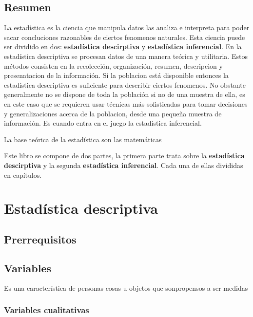 \documentclass[10pt,]{krantz}
\theoremstyle{definition}
\theoremstyle{definition}
\theoremstyle{definition}
\theoremstyle{definition}
\theoremstyle{remark}
\begin{document}
\hypertarget{resumen}{%
\chapter*{Resumen}\label{resumen}}


La estadística es la ciencia que manipula datos las analiza e interpreta para poder sacar concluciones razonables de ciertos fenomenos naturales. Esta ciencia puede ser dividido en dos: \textbf{estadística descirptiva} y \textbf{estadística inferencial}. En la estadística descriptiva se procesan datos de una manera teórica y utilitaria. Estos métodos consisten en la recolección, organización, resumen, descripcion y presenatacion de la información. Si la poblacion está disponible entonces la estadística descriptiva es suficiente para describir ciertos fenomenos. No obstante generalmente no se dispone de toda la población si no de una muestra de ella, es en este caso que se requieren usar técnicas más sofisticadas para tomar decisiones y generalizaciones acerca de la poblacion, desde una pequeña muestra de información. Es cuando entra en el juego la estadística inferencial.

La base teórica de la estadística son las matemáticas

Este libro se compone de dos partes, la primera parte trata sobre la \textbf{estadística descirptiva} y la segunda \textbf{estadística inferencial}. Cada una de ellas divididas en capítulos.

\mainmatter

\hypertarget{part-estaduxedstica-descriptiva}{%
\part{Estadística descriptiva}\label{part-estaduxedstica-descriptiva}}

\hypertarget{prerrequisitos}{%
\chapter{Prerrequisitos}\label{prerrequisitos}}

\hypertarget{variables}{%
\chapter{Variables}\label{variables}}

Es una característica de personas cosas u objetos que sonpropensos a ser medidas

\hypertarget{variables-cualitativas}{%
\section{Variables cualitativas}\label{variables-cualitativas}}
\end{document}
